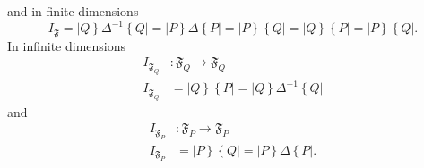 \documentclass[aps,preprint]{revtex4}%
\begin{document}
and in finite dimensions
\begin{equation}
I_{\mathfrak{F}}=\left\vert Q\right\}  \Delta^{-1}\left\{  Q\right\vert
=\left\vert P\right\}  \Delta\left\{  P\right\vert =\left\vert P\right\}
\left\{  Q\right\vert =\left\vert Q\right\}  \left\{  P\right\vert =\left\vert
P\right\}  \left\{  Q\right\vert .
\end{equation}
In infinite dimensions
\begin{align}
I_{\mathfrak{F}_{Q}}  &  :\mathfrak{F}_{Q}\rightarrow\mathfrak{F}%
_{Q}\nonumber\\
I_{\mathfrak{F}_{Q}}  &  =\left\vert Q\right\}  \left\{  P\right\vert
=\left\vert Q\right\}  \Delta^{-1}\left\{  Q\right\vert
\end{align}
and
\begin{align}
I_{\mathfrak{F}_{P}}  &  :\mathfrak{F}_{P}\rightarrow\mathfrak{F}%
_{P}\nonumber\\
I_{\mathfrak{F}_{P}}  &  =\left\vert P\right\}  \left\{  Q\right\vert
=\left\vert P\right\}  \Delta\left\{  P\right\vert .
\end{align}
\end{document}
